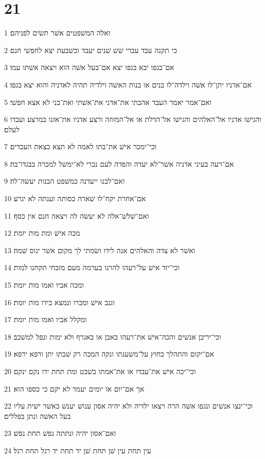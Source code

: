 \chapter{21}

\par 1 ואלה המשׁפטים אשׁר תשׂים לפניהם׃
\par 2 כי תקנה עבד עברי שׁשׁ שׁנים יעבד ובשׁבעת יצא לחפשׁי חנם׃
\par 3 אם־בגפו יבא בגפו יצא אם־בעל אשׁה הוא ויצאה אשׁתו עמו׃
\par 4 אם־אדניו יתן־לו אשׁה וילדה־לו בנים או בנות האשׁה וילדיה תהיה לאדניה והוא יצא בגפו׃
\par 5 ואם־אמר יאמר העבד אהבתי את־אדני את־אשׁתי ואת־בני לא אצא חפשׁי׃
\par 6 והגישׁו אדניו אל־האלהים והגישׁו אל־הדלת או אל־המזוזה ורצע אדניו את־אזנו במרצע ועבדו לעלם׃
\par 7 וכי־ימכר אישׁ את־בתו לאמה לא תצא כצאת העבדים׃
\par 8 אם־רעה בעיני אדניה אשׁר־לא יעדה והפדה לעם נכרי לא־ימשׁל למכרה בבגדו־בה׃
\par 9 ואם־לבנו ייעדנה כמשׁפט הבנות יעשׂה־לה׃
\par 10 אם־אחרת יקח־לו שׁארה כסותה וענתה לא יגרע׃
\par 11 ואם־שׁלשׁ־אלה לא יעשׂה לה ויצאה חנם אין כסף׃
\par 12 מכה אישׁ ומת מות יומת׃
\par 13 ואשׁר לא צדה והאלהים אנה לידו ושׂמתי לך מקום אשׁר ינוס שׁמה׃
\par 14 וכי־יזד אישׁ על־רעהו להרגו בערמה מעם מזבחי תקחנו למות׃
\par 15 ומכה אביו ואמו מות יומת׃
\par 16 וגנב אישׁ ומכרו ונמצא בידו מות יומת׃
\par 17 ומקלל אביו ואמו מות יומת׃
\par 18 וכי־יריבן אנשׁים והכה־אישׁ את־רעהו באבן או באגרף ולא ימות ונפל למשׁכב׃
\par 19 אם־יקום והתהלך בחוץ על־משׁענתו ונקה המכה רק שׁבתו יתן ורפא ירפא׃
\par 20 וכי־יכה אישׁ את־עבדו או את־אמתו בשׁבט ומת תחת ידו נקם ינקם׃
\par 21 אך אם־יום או יומים יעמד לא יקם כי כספו הוא׃
\par 22 וכי־ינצו אנשׁים ונגפו אשׁה הרה ויצאו ילדיה ולא יהיה אסון ענושׁ יענשׁ כאשׁר ישׁית עליו בעל האשׁה ונתן בפללים׃
\par 23 ואם־אסון יהיה ונתתה נפשׁ תחת נפשׁ׃
\par 24 עין תחת עין שׁן תחת שׁן יד תחת יד רגל תחת רגל׃
